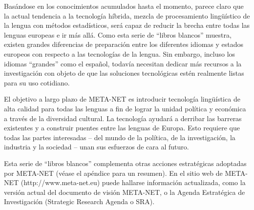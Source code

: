 \begin{multicols}{2}
  Basándose en los conocimientos acumulados hasta el momento, parece claro que la actual tendencia a la tecnología híbrida, mezcla de procesamiento lingüístico de la lengua con métodos estadísticos, será capaz de reducir la brecha entre todas las lenguas europeas e ir más allá. Como esta serie de “libros blancos” muestra, existen grandes diferencias de preparación entre los diferentes idiomas y estados europeos con respecto a las tecnologías de la lengua. Sin embargo, incluso los idiomas “grandes” como el español, todavía necesitan dedicar más recursos a la investigación con objeto de que las soluciones tecnológicas estén realmente listas para su uso cotidiano. 

  El objetivo a largo plazo de META-NET es introducir tecnología lingüística de alta calidad para todas las lenguas a fin de lograr la unidad política y económica a través de la diversidad cultural. La tecnología ayudará a derribar las barreras existentes y a construir puentes entre las lenguas de Europa. Esto requiere que todas las partes interesadas -- del mundo de la política, de la investigación, la industria y la sociedad --  unan sus esfuerzos de cara al futuro.
  
  
  Esta serie de “libros blancos” complementa otras acciones estratégicas adoptadas por META-NET (véase el apéndice para un resumen). En el sitio web de META-NET  (http://www.meta-net.eu) puede hallarse información actualizada, como la versión actual del documento de visión META-NET, o la Agenda Estratégica de Investigación (Strategic Research Agenda o SRA).
  
\end{multicols}

\clearpage



